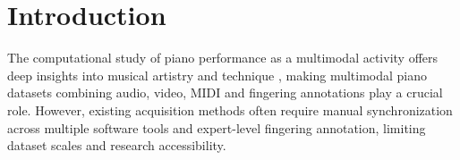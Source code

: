 \documentclass{article}
\begin{document}
\begin{abstract}
\end{abstract}

\section{Introduction}\label{sec:introduction}


The computational study of piano performance as a multimodal activity offers deep insights into musical artistry and technique \cite{jensen2012multimodal, riley2005use, parmar2021piano}, making multimodal piano datasets combining audio, video, MIDI and fingering annotations play a crucial role. However, existing acquisition methods often require manual synchronization across multiple software tools and expert-level fingering annotation, limiting dataset scales and research accessibility.
\end{document}
